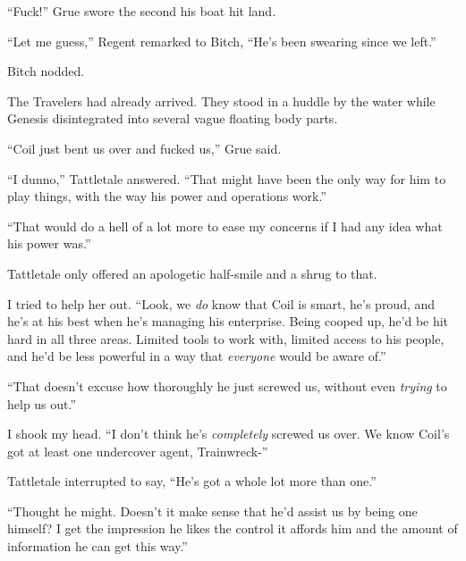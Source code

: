 





``Fuck!'' Grue swore the second his boat hit land.



``Let me guess,'' Regent remarked to Bitch, ``He's been swearing since we left.''



Bitch nodded.



The Travelers had already arrived.  They stood in a huddle by the water while Genesis disintegrated into several vague floating body parts.



``Coil just bent us over and fucked us,'' Grue said.



``I dunno,'' Tattletale answered.  ``That might have been the only way for him to play things, with the way his power and operations work.''



``That would do a hell of a lot more to ease my concerns if I had any idea what his power was.''



Tattletale only offered an apologetic half-smile and a shrug to that.



I tried to help her out.  ``Look, we \emph{do} know that Coil is smart, he's proud, and he's at his best when he's managing his enterprise.  Being cooped up, he'd be hit hard in all three areas.  Limited tools to work with, limited access to his people, and he'd be less powerful in a way that \emph{everyone} would be aware of.''



``That doesn't excuse how thoroughly he just screwed us, without even \emph{trying} to help us out.''



I shook my head. ``I don't think he's \emph{completely }screwed us over.  We know Coil's got at least one undercover agent, Trainwreck-''



Tattletale interrupted to say, ``He's got a whole lot more than one.''



``Thought he might.  Doesn't it make sense that he'd assist us by being one himself?  I get the impression he likes the control it affords him and the amount of information he can get this way.''




